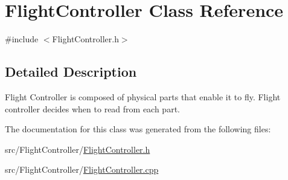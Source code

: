 \hypertarget{classFlightController}{}\section{Flight\+Controller Class Reference}
\label{classFlightController}


{\ttfamily \#include $<$Flight\+Controller.\+h$>$}



\subsection{Detailed Description}
Flight Controller is composed of physical parts that enable it to fly. Flight controller decides when to read from each part. 

The documentation for this class was generated from the following files\+:\begin{DoxyCompactItemize}
\item 
src/\+Flight\+Controller/\hyperlink{FlightController_8h}{Flight\+Controller.\+h}\item 
src/\+Flight\+Controller/\hyperlink{FlightController_8cpp}{Flight\+Controller.\+cpp}\end{DoxyCompactItemize}
